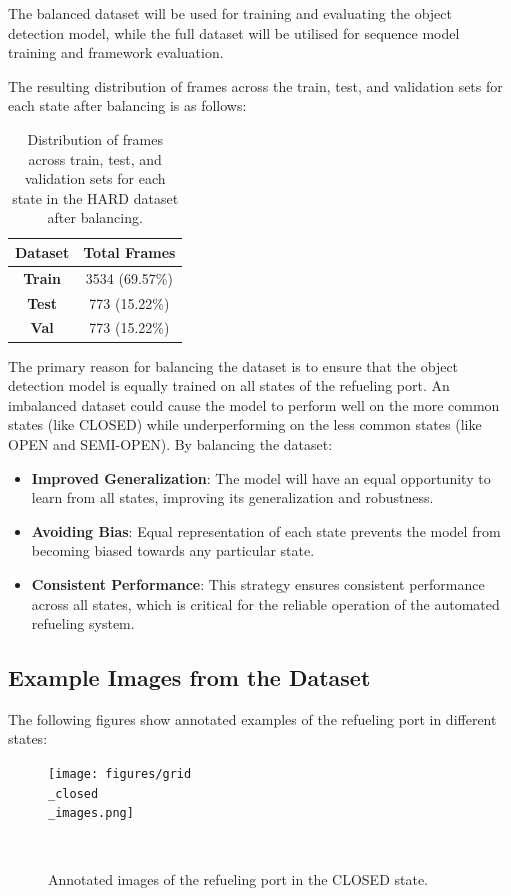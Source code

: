\documentclass[12pt,oneside]{book} %
\begin{document}
The balanced dataset will be used for training and evaluating the object
detection model, while the full dataset will be utilised for sequence model
training and framework evaluation.

The resulting distribution of frames across the train, test, and validation
sets for each state after balancing is as follows:
\begin{table}[H]
    \centering
    \begin{tabular}{@{}cc@{}}
        \toprule
        \textbf{Dataset} & \textbf{Total Frames} \\ \midrule
        \textbf{Train}   & 3534 (69.57\%)        \\ 
        \textbf{Test}    & 773  (15.22\%)        \\ 
        \textbf{Val}     & 773  (15.22\%)        \\ \bottomrule
    \end{tabular}
    \caption{\centering Distribution of frames across train, test, and validation sets for each state in the HARD dataset after balancing.}
    \label{tab:balanced_frame_distribution}
\end{table}

The primary reason for balancing the dataset is to ensure that the object
detection model is equally trained on all states of the refueling port. An
imbalanced dataset could cause the model to perform well on the more common
states (like CLOSED) while underperforming on the less common states (like OPEN
and SEMI-OPEN). By balancing the dataset:

\begin{itemize}
    \item \textbf{Improved Generalization}: The model will have an equal opportunity to learn from all states, improving its generalization and robustness.
    \item \textbf{Avoiding Bias}: Equal representation of each state prevents the model from becoming biased towards any particular state.
    \item \textbf{Consistent Performance}: This strategy ensures consistent performance across all states, which is critical for the reliable operation of the automated refueling system.
\end{itemize}

\subsection{Example Images from the Dataset}
The following figures show annotated examples of the refueling port in
different states:
\begin{figure}[H]
    \centering
    \texttt{[image: figures/grid\\\_closed\\\_images.png]}
    \caption{Annotated images of the refueling port in the CLOSED state.}~\label{fig:grid-closed-images}
\end{figure}
\end{document}
